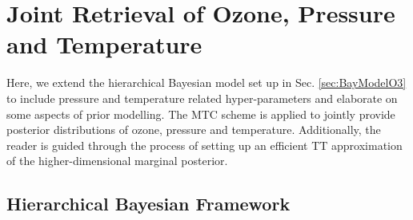 \chapter{Joint Retrieval of Ozone, Pressure and Temperature}
\label{ch:FullBay}
\thispagestyle{empty}
Here, we extend the hierarchical Bayesian model set up in Sec. \ref{sec:BayModelO3} to include pressure and temperature related hyper-parameters and elaborate on some aspects of prior modelling.
The MTC scheme is applied to jointly provide posterior distributions of ozone, pressure and temperature.
Additionally, the reader is guided through the process of setting up an efficient TT approximation of the higher-dimensional marginal posterior.



\section{Hierarchical Bayesian Framework}
\label{sec:FullHierarch}
